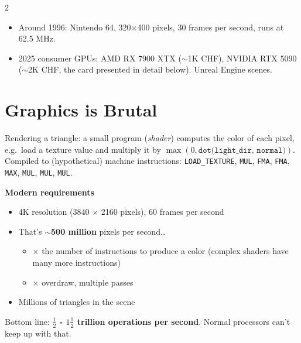 \documentclass[a4paper,9pt]{extarticle}
\begin{document}
\begin{multicols}{2}
\begin{example}
\begin{itemize}
\item Around 1996: Nintendo 64, 320$\times$400 pixels, 30 frames per second, runs at 62.5 MHz.

\item 2025 consumer GPUs: AMD RX 7900 XTX ($\sim$1K CHF), NVIDIA RTX 5090 ($\sim$2K CHF, the
card presented in detail below). Unreal Engine scenes.

\end{itemize}

\end{example}



\section{Graphics is Brutal}


Rendering a triangle: a small program (\emph{shader}) computes the color of each pixel, e.g.\
load a texture value and multiply it by $\max(0, \texttt{dot(light\_dir, normal)})$. Compiled to
(hypothetical) machine instructions: \texttt{LOAD\_TEXTURE}, \texttt{MUL}, \texttt{FMA},
\texttt{FMA}, \texttt{MAX}, \texttt{MUL}, \texttt{MUL}, \texttt{MUL}.


\begin{formula}

\textbf{Modern requirements}

\begin{itemize}

\item 4K resolution (3840 $\times$ 2160 pixels), 60 frames per second

\item That's $\sim$\textbf{500 million} pixels per second\dots

\begin{itemize}

\item $\times$ the number of instructions to produce a color (complex shaders have many
more instructions)

\item $\times$ overdraw, multiple passes

\end{itemize}

\item Millions of triangles in the scene

\end{itemize}

Bottom line: \textbf{$\frac{1}{2}$ - $1\frac{1}{2}$ trillion operations per second}. Normal
processors can't keep up with that.


\end{formula}
\end{multicols}
\end{document}
